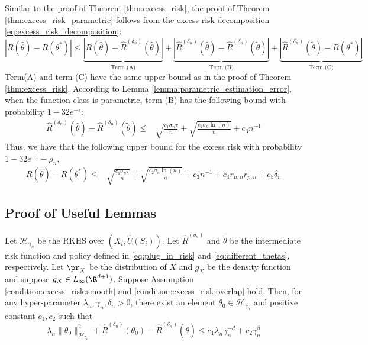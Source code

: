 Similar to the proof of Theorem \ref{thm:excess_risk}, the proof of Theorem \ref{thm:excess_risk_parametric} follows from the excess risk decomposition \eqref{eq:excess_risk_decomposition}:
$$ |R(\widehat\theta)-R\left(\theta^*\right)|\leq \underbrace{|R(\widehat\theta)-\widehat R^{({\delta_n})}(\widehat\theta)|}_{\text{Term (A)}} + \underbrace{|\widehat R^{({\delta_n})}(\widehat\theta) - \widehat R^{({\delta_n})}(\tilde\theta)|}_{\text{Term (B)}} + \underbrace{|\widehat R^{({\delta_n})}(\tilde\theta) - R(\theta^*)|}_{\text{Term (C)}} $$
Term(A) and term (C) have the same upper bound as in the proof of Theorem \ref{thm:excess_risk}. According to Lemma \ref{lemma:parametric_estimation_error}, when the function class is parametric, term (B) has the following bound with probability $1-32e^{-\tau}$:
\begin{align*}
    \widehat R^{({\delta_n})}(\widehat\theta) - \widehat R^{({\delta_n})}(\tilde\theta)\leq & \sqrt{\frac{c_1\sigma_n\tau}{n}} + \sqrt{\frac{ c_2\sigma_n\ln(n)}{n}}  + c_3n^{-1}
\end{align*}
Thus, we have that the following upper bound for the excess risk with probability $1-32e^{-\tau} - \rho_n$,
\begin{align*}
       R(\widehat\theta)-R\left(\theta^*\right)\leq &  \sqrt{\frac{c_1\sigma_n\tau}{n}} + \sqrt{\frac{ c_2\sigma_n\ln(n)}{n}}  + c_3n^{-1}+ c_4r_{\mu,n}r_{p,n} + c_5{\delta_n}
    \end{align*}

\subsection{Proof of Useful Lemmas}

\begin{lemma}\label{lemma:svm_approximation_error} 
    Let $\mathcal{H}_{\gamma_n}$ be the RKHS over $(X_i,\widehat U(S_i))$. Let $\widehat R^{({\delta_n})}$ and $\tilde \theta$ be the intermediate risk function and policy defined in \eqref{eq:plug_in_risk} and \eqref{eq:different_thetas}, respectively. Let $\pr_X$ be the distribution of $X$ and  $g_X$ be the density function and suppose $g_X\in L_\infty(\R^{d+1})$. Suppose Assumption \ref{condition:excess_risk:smooth} and \ref{condition:excess_risk:overlap} hold. Then, for any  hyper-parameter $\lambda_n, \gamma_n,\delta_n>0$, there exist an element $\theta_0\in \mathcal{H}_{\gamma_n}$ and positive constant $c_1,c_2$ such that  
\begin{equation}\label{eq:approx_error_svm}
\lambda_n\|\theta_0\|^2_{\mathcal{H}_{\gamma_n}}+\widehat R^{({\delta_n})}(\theta_0) -\widehat R^{({\delta_n})}(\tilde\theta) \leq c_1 \lambda_n\gamma_n^{-d} + c_2\gamma_n^{\beta}
    \end{equation}

\end{lemma}

